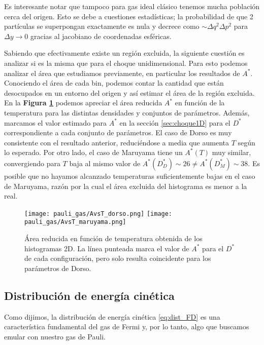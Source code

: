 Es interesante notar que tampoco para gas ideal clásico tenemos mucha población cerca del origen.
Esto se debe a cuestiones estadísticas; la probabilidad de que 2 partículas se superpongan exactamente es nula y decrece como
$\sim\Delta q^2\Delta p^2$ para 
$\Delta y\to0$ gracias al jacobiano de coordenadas esféricas.

Sabiendo que efectivamente existe un región excluida, la siguiente cuestión es analizar si es la misma que para el choque unidimensional.
Para esto podemos analizar el área que estudiamos previamente, en particular los resultados de $A^*$.
Conociendo el área de cada bin, podemos contar la cantidad que están desocupados en un entorno del origen y así estimar el área de la región excluida.
En la \textbf{Figura \ref{fig:AvsT}} podemos apreciar el área reducida $A^*$ en función de la temperatura para las distintas densidades y conjuntos de parámetros.
Además, marcamos el valor estimado para $A^*$ en la sección \ref{sec:choque1D} para el $D^*$ correspondiente a cada conjunto de parámetros.
El caso de Dorso es muy consistente con el resultado anterior, reduciéndose a media que aumenta $T$ según lo esperado.
Por otro lado, el caso de Maruyama tiene un $A^*(T)$ muy similar, convergiendo para $T$ baja al mismo valor de $A^*(D^*_D)\sim 26 \neq A^*(D^*_M)\sim 38$.
Es posible que no hayamos alcanzado temperaturas suficientemente bajas en el caso de Maruyama, razón por la cual el área excluida del histograma es menor a la real.

\begin{figure}[H]
	\centering	%
	\texttt{[image: pauli\_gas/AvsT\_dorso.png]}
	\texttt{[image: pauli\_gas/AvsT\_maruyama.png]}
	\caption{Área reducida en función de temperatura obtenida de los histogramas 2D.
  La línea punteada marca el valor de $A^*$ para el $D^*$ de cada configuración, pero solo resulta coincidente para los parámetros de Dorso.}
	\label{fig:AvsT}
\end{figure}


\subsection{Distribución de energía cinética}{\label{sec:dist_energ}}

Como dijimos, la distribución de energía cinética \eqref{eq:dist_FD} es una característica fundamental del gas de Fermi y, por lo tanto, algo que buscamos 
emular con nuestro gas de Pauli.

